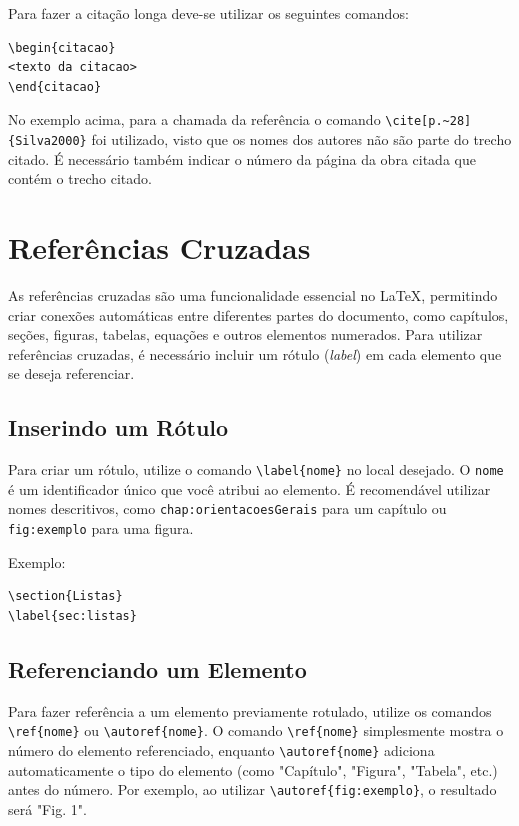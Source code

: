 Para fazer a citação longa deve-se utilizar os seguintes comandos:
\begin{verbatim}
\begin{citacao}
<texto da citacao>
\end{citacao}
\end{verbatim}

No exemplo acima, para a chamada da referência o comando \verb|\cite[p.~28]{Silva2000}| foi utilizado, visto que os nomes dos autores não são parte do trecho citado. É necessário também indicar o número da página da obra citada que contém o trecho citado.


\section{Referências Cruzadas}
\label{sec:referenciasCruzadas}

As referências cruzadas são uma funcionalidade essencial no \LaTeX{}, permitindo criar conexões automáticas entre diferentes partes do documento, como capítulos, seções, figuras, tabelas, equações e outros elementos numerados. Para utilizar referências cruzadas, é necessário incluir um rótulo (\textit{label}) em cada elemento que se deseja referenciar.

\subsection{Inserindo um Rótulo}
Para criar um rótulo, utilize o comando \verb|\label{nome}| no local desejado. O \verb|nome| é um identificador único que você atribui ao elemento. É recomendável utilizar nomes descritivos, como \verb|chap:orientacoesGerais| para um capítulo ou \verb|fig:exemplo| para uma figura. 

Exemplo:
\begin{verbatim}
\section{Listas}
\label{sec:listas}
\end{verbatim}

\subsection{Referenciando um Elemento}
Para fazer referência a um elemento previamente rotulado, utilize os comandos \verb|\ref{nome}| ou \verb|\autoref{nome}|. O comando \verb|\ref{nome}| simplesmente mostra o número do elemento referenciado, enquanto \verb|\autoref{nome}| adiciona automaticamente o tipo do elemento (como "Capítulo", "Figura", "Tabela", etc.) antes do número. Por exemplo, ao utilizar \verb|\autoref{fig:exemplo}|, o resultado será "Fig. 1".

